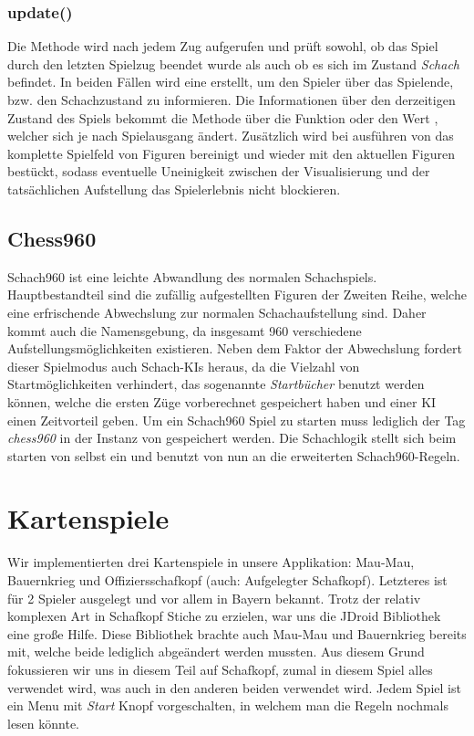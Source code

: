 \subsubsection{update()}
Die Methode  wird nach jedem Zug aufgerufen und prüft sowohl, ob 
das Spiel durch den letzten Spielzug beendet wurde als auch ob es sich im 
Zustand \emph{Schach} befindet. In beiden Fällen wird eine  
erstellt, um den Spieler über das Spielende, bzw. den Schachzustand zu 
informieren. Die Informationen über den derzeitigen Zustand des Spiels bekommt 
die Methode über die Funktion  oder den Wert , 
welcher sich je nach Spielausgang ändert. Zusätzlich wird bei ausführen von 
 das komplette Spielfeld von Figuren bereinigt und 
wieder mit den aktuellen Figuren bestückt, sodass eventuelle Uneinigkeit 
zwischen der Visualisierung und der tatsächlichen Aufstellung das Spielerlebnis 
nicht blockieren.

\subsection{Chess960}
Schach960 ist eine leichte Abwandlung des normalen Schachspiels. 
Hauptbestandteil sind die zufällig aufgestellten Figuren der Zweiten Reihe, 
welche eine erfrischende Abwechslung zur normalen Schachaufstellung sind. Daher 
kommt auch die Namensgebung, da insgesamt 960 verschiedene 
Aufstellungsmöglichkeiten existieren. Neben dem Faktor der Abwechslung fordert 
dieser Spielmodus auch Schach-KIs heraus, da die Vielzahl von Startmöglichkeiten 
verhindert, das sogenannte \emph{Startbücher} benutzt werden können, welche die 
ersten Züge vorberechnet gespeichert haben und einer KI einen Zeitvorteil geben. 
Um ein Schach960 Spiel zu starten muss lediglich der Tag \emph{chess960} in der 
Instanz von  gespeichert werden. Die Schachlogik stellt sich beim 
starten von selbst ein und benutzt von nun an die erweiterten Schach960-Regeln.

\section{Kartenspiele}
\sectionauthor{\philipp}

Wir implementierten drei Kartenspiele in unsere Applikation: Mau-Mau,
Bauernkrieg und Offiziersschafkopf (auch: Aufgelegter Schafkopf). Letzteres ist
für 2 Spieler ausgelegt und vor allem in Bayern bekannt. Trotz der relativ
komplexen Art in Schafkopf Stiche zu erzielen, war uns die JDroid Bibliothek
eine große Hilfe. Diese Bibliothek brachte auch Mau-Mau und Bauernkrieg bereits
mit, welche beide lediglich abgeändert werden mussten.  Aus diesem Grund
fokussieren wir uns in diesem Teil auf Schafkopf, zumal in diesem Spiel alles
verwendet wird, was auch in den anderen beiden verwendet wird. Jedem Spiel ist
ein Menu mit \emph{Start} Knopf vorgeschalten, in welchem man die Regeln
nochmals lesen könnte.

